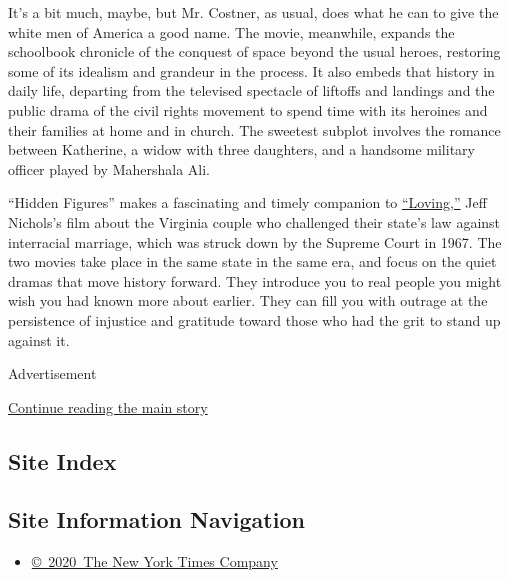 It's a bit much, maybe, but Mr. Costner, as usual, does what he can to
give the white men of America a good name. The movie, meanwhile, expands
the schoolbook chronicle of the conquest of space beyond the usual
heroes, restoring some of its idealism and grandeur in the process. It
also embeds that history in daily life, departing from the televised
spectacle of liftoffs and landings and the public drama of the civil
rights movement to spend time with its heroines and their families at
home and in church. The sweetest subplot involves the romance between
Katherine, a widow with three daughters, and a handsome military officer
played by Mahershala Ali.

``Hidden Figures'' makes a fascinating and timely companion to
\href{https://www.nytimes3xbfgragh.onion/2016/11/04/movies/loving-review-joel-edgerton-ruth-negga.html}{``Loving,''}
Jeff Nichols's film about the Virginia couple who challenged their
state's law against interracial marriage, which was struck down by the
Supreme Court in 1967. The two movies take place in the same state in
the same era, and focus on the quiet dramas that move history forward.
They introduce you to real people you might wish you had known more
about earlier. They can fill you with outrage at the persistence of
injustice and gratitude toward those who had the grit to stand up
against it.

Advertisement

\protect\hyperlink{after-bottom}{Continue reading the main story}

\hypertarget{site-index}{%
\subsection{Site Index}\label{site-index}}

\hypertarget{site-information-navigation}{%
\subsection{Site Information
Navigation}\label{site-information-navigation}}

\begin{itemize}
\tightlist
\item
  \href{https://help.nytimes3xbfgragh.onion/hc/en-us/articles/115014792127-Copyright-notice}{©~2020~The
  New York Times Company}
\end{itemize}

